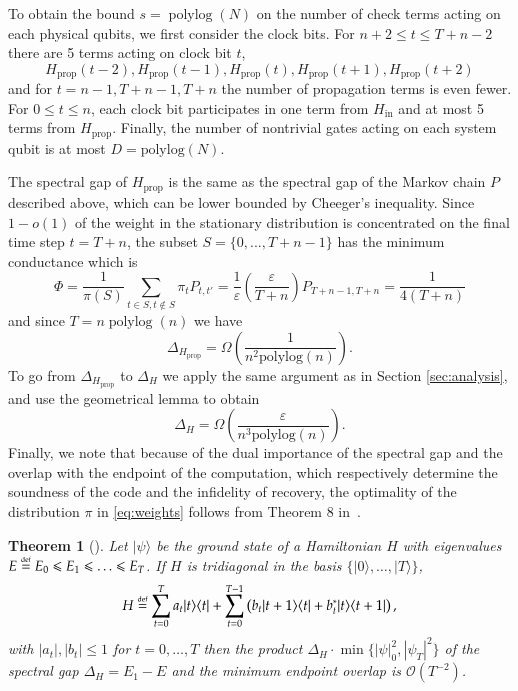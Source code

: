 \documentclass[11pt,letterpaper]{article}
\newtheorem{theorem}{Theorem}[section]
\theoremstyle{definition}
\theoremstyle{remark}
\newcommand{\defeq}{\stackrel{\mbox{\normalfont\tiny def}}=}
\DeclareMathOperator{\polylog}{polylog}
\renewcommand{\leq}{\leqslant}
\let\epsilon=\varepsilon
\numberwithin{equation}{section}
\theoremstyle{definition}
\begin{document}
To obtain the bound $s = \polylog(N)$ on the number of check terms acting on each physical qubits, we first consider the clock bits.  For $n + 2 \leq t \leq T + n -2$ there are 5 terms acting on clock bit $t$, 
\begin{equation}
H_{\textrm{prop}}(t-2) , H_{\textrm{prop}}(t-1) ,  H_{\textrm{prop}}(t) , H_{\textrm{prop}}(t+1) , H_{\textrm{prop}}(t+2)
\end{equation}
and for $t = n -1,T+n - 1,T + n$ the number of propagation terms is even fewer.   For $ 0 \leq t \leq n$, each clock bit participates in one term from $H_{\textrm{in}}$ and at most 5 terms from $H_{\textrm{prop}}$.  Finally, the number of nontrivial gates acting on each system qubit is at most $D = \textrm{polylog}(N)$. 

The spectral gap of $H_{\textrm{prop}}$ is the same as the spectral gap of the Markov chain $P$ described above, which can be lower bounded by Cheeger's inequality.  Since $1 - o(1)$ of the weight in the stationary distribution is concentrated on the final time step $t = T + n$, the subset $S = \{0,...,T + n -1\}$ has the minimum conductance which is
\begin{equation}
\Phi = \frac{1}{\pi(S)} \sum_{t \in S , t \notin S} \pi_t P_{t,t'} =  \frac{1}{\epsilon}\left(\frac{\epsilon}{T + n}\right) P_{T + n -1, T+n} = \frac{1}{4(T + n)}
\end{equation}
and since $T = n \polylog(n)$ we have
\begin{equation}
\Delta_{H_{\textrm{prop}}} = \Omega \left(\frac{1}{n^2 \textrm{polylog}(n)} \right).
\end{equation}
To go from $\Delta_{H_{\textrm{prop}}}$ to $\Delta_H$ we apply the same argument as in Section \ref{sec:analysis}, and use the geometrical lemma to obtain
\begin{equation}
\Delta_H = \Omega \left(\frac{\varepsilon}{n^3 \textrm{polylog}(n)} \right).
\end{equation}
Finally, we note that because of the dual importance of the spectral gap and the overlap with the endpoint of the computation, which respectively determine the soundness of the code and the infidelity of recovery, the optimality of the distribution $\pi$ in \eqref{eq:weights} follows from Theorem 8 in~\cite{Bausch2018analysislimitations}.
\begin{theorem}[\cite{Bausch2018analysislimitations}]
Let $|\psi\rangle$ be the ground state of a Hamiltonian $H$ with eigenvalues $E \defeq E_0 \leq E_1 \leq \ldots \leq E_T$.  If $H$ is tridiagonal in the basis $\{|0\rangle,\ldots,|T\rangle\}$,
\begin{equation}
H \defeq \sum_{t = 0}^T a_t |t\rangle \langle t | + \sum_{t =0}^{T-1} \left ( b_t|t +1\rangle \langle t | + b^*_t|t\rangle \langle t + 1| \right),
\end{equation}
with $|a_t|, |b_t| \leq 1$ for $t = 0,\ldots,T$ then the product $\Delta_{H} \cdot \min \{ |\psi|^2_0,  |\psi_T|^2\} $ of the spectral gap $\Delta_{H} = E_1 - E$ and the minimum endpoint overlap is $\mathcal{O}(T^{-2})$.  
\end{theorem}
\end{document}

